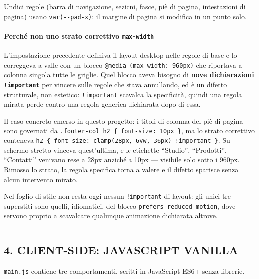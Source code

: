 \documentclass[
  11pt,
]{article}
\begin{document}
Undici regole (barra di navigazione, sezioni, fasce, piè di pagina,
intestazioni di pagina) usano \texttt{var(-\/-pad-x)}: il margine di
pagina si modifica in un punto solo.

\hypertarget{perchuxe9-non-uno-strato-correttivo-max-width}{%
\paragraph{\texorpdfstring{Perché non uno strato correttivo
\texttt{max-width}}{Perché non uno strato correttivo max-width}}\label{perchuxe9-non-uno-strato-correttivo-max-width}}

L'impostazione precedente definiva il layout desktop nelle regole di
base e lo correggeva a valle con un blocco
\texttt{@media\ (max-width:\ 960px)} che riportava a colonna singola
tutte le griglie. Quel blocco aveva bisogno di \textbf{nove
dichiarazioni \texttt{!important}} per vincere sulle regole che stava
annullando, ed è un difetto strutturale, non estetico:
\texttt{!important} scavalca la specificità, quindi una regola mirata
perde contro una regola generica dichiarata dopo di essa.

Il caso concreto emerso in questo progetto: i titoli di colonna del piè
di pagina sono governati da
\texttt{.footer-col\ h2\ \{\ font-size:\ 10px\ \}}, ma lo strato
correttivo conteneva
\texttt{h2\ \{\ font-size:\ clamp(28px,\ 6vw,\ 36px)\ !important\ \}}.
Su schermo stretto vinceva quest'ultima, e le etichette ``Studio'',
``Prodotti'', ``Contatti'' venivano rese a 28px anziché a 10px ---
visibile solo sotto i 960px. Rimosso lo strato, la regola specifica
torna a valere e il difetto sparisce senza alcun intervento mirato.

Nel foglio di stile non resta oggi nessun \texttt{!important} di layout:
gli unici tre superstiti sono quelli, idiomatici, del blocco
\texttt{prefers-reduced-motion}, dove servono proprio a scavalcare
qualunque animazione dichiarata altrove.

\begin{center}\rule{0.5\linewidth}{0.5pt}\end{center}

\hypertarget{client-side-javascript-vanilla}{%
\subsection{4. CLIENT-SIDE: JAVASCRIPT
VANILLA}\label{client-side-javascript-vanilla}}

\texttt{main.js} contiene tre comportamenti, scritti in JavaScript ES6+
senza librerie.
\end{document}
